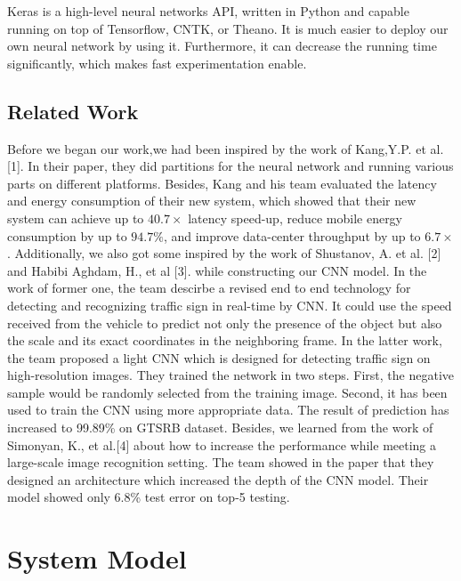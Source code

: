 \documentclass[conference]{IEEEtran}
\begin{document}
Keras is a high-level neural networks API, written in Python and capable running on top of Tensorflow, CNTK, or Theano. It is much easier to deploy our own neural network by using it. Furthermore, it can decrease the running time significantly, which makes fast experimentation enable. 

\subsection{Related Work}

Before we began our work,we had been inspired by the work of Kang,Y.P. et al. [1]. In their paper, they did partitions for the neural network and running various parts on different platforms. Besides, Kang and his team evaluated the latency and energy consumption of their new system, which showed that their new system can achieve up to $40.7 \times$ latency speed-up, reduce mobile energy consumption by up to $94.7 \%$, and improve data-center throughput by up to $6.7 \times$. Additionally, we also got some inspired by the work of Shustanov, A. et al. [2] and Habibi Aghdam, H., et al [3]. while constructing our CNN model. In the work of former one, the team descirbe a revised end to end technology for detecting and recognizing traffic sign in real-time by CNN. It could use the speed received from the vehicle to predict not only the presence of the object but also the scale and its exact coordinates in the neighboring frame. In the latter work, the team proposed a light CNN which is designed for detecting traffic sign on high-resolution images. They trained the network in two steps. First, the negative sample would be randomly selected from the training image. Second, it has been used to train the CNN using more appropriate data. The result of prediction has increased to 99.89\% on GTSRB dataset. Besides, we learned from the work of Simonyan, K., et al.[4] about how to increase the performance while meeting a large-scale image recognition setting. The team showed in the paper that they designed an architecture which increased the depth of the CNN model. Their model showed only 6.8\% test error on top-5 testing.   



\section{System Model}
\end{document}
